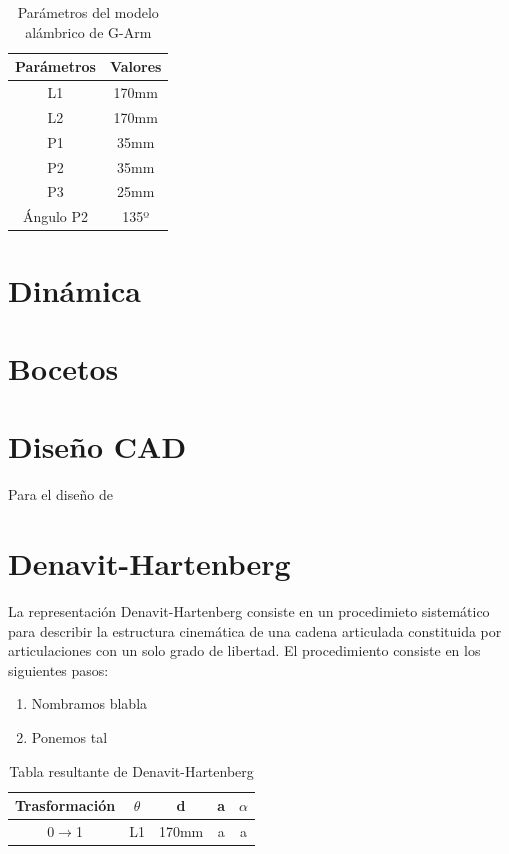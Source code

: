 \begin{table}[H]
\begin{center}
\begin{tabular}{|c|c|}
\hline
\textbf{Parámetros} & \textbf{Valores} \\
\hline
L1 & 170mm \\
L2 & 170mm \\
P1 & 35mm \\
P2 & 35mm \\
P3 & 25mm \\
Ángulo P2 & 135º \\
\hline
\end{tabular}
\caption{Parámetros del modelo alámbrico de G-Arm}
\label{cuadro:ejemplo}
\end{center}
\end{table}


\section{Dinámica}



\section{Bocetos}


\section{Diseño CAD}
Para el diseño de 

\section{Denavit-Hartenberg}
La representación Denavit-Hartenberg consiste en un procedimieto sistemático para describir la estructura cinemática de una cadena 
articulada constituida por articulaciones con un solo grado de libertad. El procedimiento consiste en los siguientes pasos:
\begin{enumerate}
\item Nombramos blabla
\item Ponemos tal
\end{enumerate}

\begin{table}[H]
\begin{center}
\begin{tabular}{|c|c|c|c|c|}
\hline
\textbf{Trasformación} & \textbf{$\theta$} & \textbf{d} & \textbf{a} & \textbf{$\alpha$}\\
\hline
0$\rightarrow$1 & L1 & 170mm & a & a \\
\hline
\end{tabular}
\caption{Tabla resultante de Denavit-Hartenberg}
\label{cuadro:tablaDH}
\end{center}
\end{table}
  
